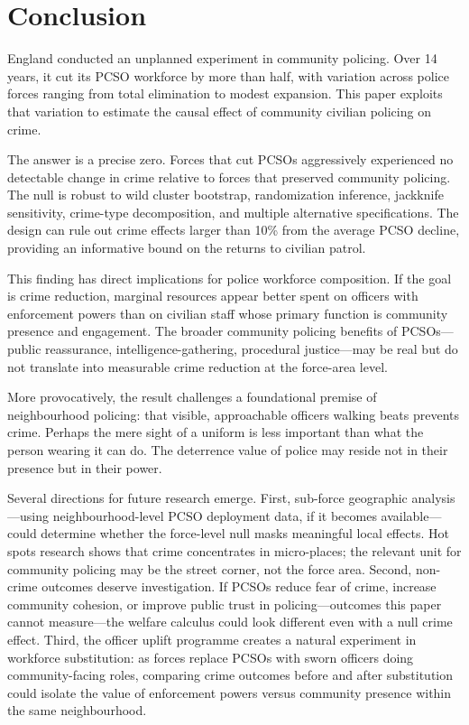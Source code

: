 \documentclass[12pt]{article}
\begin{document}
\section{Conclusion}

England conducted an unplanned experiment in community policing. Over 14 years, it cut its PCSO workforce by more than half, with variation across police forces ranging from total elimination to modest expansion. This paper exploits that variation to estimate the causal effect of community civilian policing on crime.

The answer is a precise zero. Forces that cut PCSOs aggressively experienced no detectable change in crime relative to forces that preserved community policing. The null is robust to wild cluster bootstrap, randomization inference, jackknife sensitivity, crime-type decomposition, and multiple alternative specifications. The design can rule out crime effects larger than 10\% from the average PCSO decline, providing an informative bound on the returns to civilian patrol.

This finding has direct implications for police workforce composition. If the goal is crime reduction, marginal resources appear better spent on officers with enforcement powers than on civilian staff whose primary function is community presence and engagement. The broader community policing benefits of PCSOs---public reassurance, intelligence-gathering, procedural justice---may be real but do not translate into measurable crime reduction at the force-area level.

More provocatively, the result challenges a foundational premise of neighbourhood policing: that visible, approachable officers walking beats prevents crime. Perhaps the mere sight of a uniform is less important than what the person wearing it can do. The deterrence value of police may reside not in their presence but in their power.

Several directions for future research emerge. First, sub-force geographic analysis---using neighbourhood-level PCSO deployment data, if it becomes available---could determine whether the force-level null masks meaningful local effects. Hot spots research \citep{braga2019hot} shows that crime concentrates in micro-places; the relevant unit for community policing may be the street corner, not the force area. Second, non-crime outcomes deserve investigation. If PCSOs reduce fear of crime, increase community cohesion, or improve public trust in policing---outcomes this paper cannot measure---the welfare calculus could look different even with a null crime effect. Third, the officer uplift programme creates a natural experiment in workforce substitution: as forces replace PCSOs with sworn officers doing community-facing roles, comparing crime outcomes before and after substitution could isolate the value of enforcement powers versus community presence within the same neighbourhood.
\end{document}
